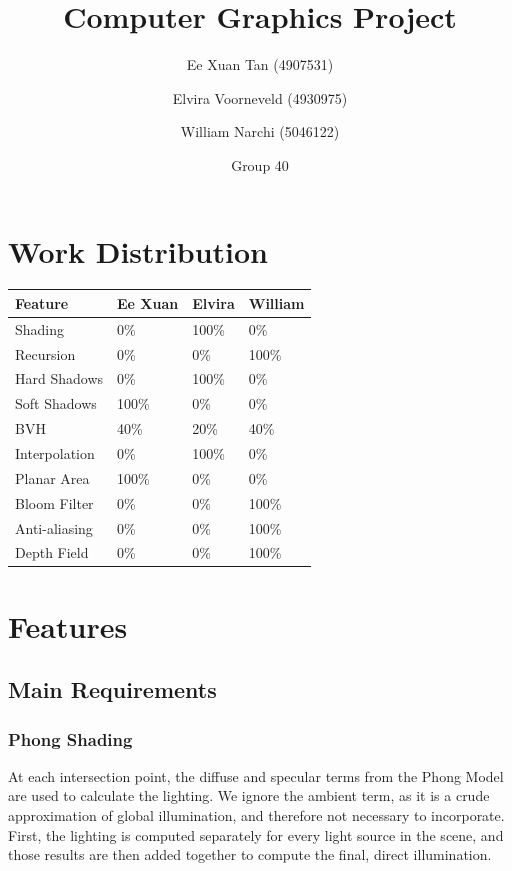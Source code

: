 \documentclass{article}
\author{Ee Xuan Tan (4907531) \and Elvira Voorneveld (4930975) \and William Narchi (5046122)}
\date{Group 40}
\title{Computer Graphics Project}
\begin{document}
    \maketitle

    \section{Work Distribution}
    \begin{tabular}{ |p{2.5cm}||p{2.5cm}|p{2.5cm}|p{2.5cm}| }
        \hline
        \textbf{Feature} &\textbf{Ee Xuan} &\textbf{Elvira} &\textbf{William}\\
        \hline
        Shading                        &0\%    &100\%  &0\%\\
        Recursion                      &0\%    &0\%    &100\%\\
        Hard Shadows                   &0\%    &100\%  &0\%\\
        Soft Shadows                   &100\%  &0\%    &0\%\\
        BVH                            &40\%   &20\%   &40\%\\
        Interpolation                  &0\%    &100\%  &0\%\\
        Planar Area                    &100\%  &0\%    &0\%\\
        Bloom Filter                   &0\%    &0\%    &100\%\\
        Anti-aliasing                  &0\%    &0\%    &100\%\\
        Depth Field                    &0\%    &0\%    &100\%\\
        \hline
    \end{tabular}

    \newpage

    \section{Features}
    \subsection{Main Requirements}
    \subsubsection{Phong Shading}
    At each intersection point, the diffuse and specular terms from the Phong Model are used to calculate the 
    lighting. We ignore the ambient term, as it is a crude approximation of global illumination, and therefore 
    not necessary to incorporate. First, the lighting is computed separately for every light source in the 
    scene, and those results are then added together to compute the final, direct illumination.
\end{document}
